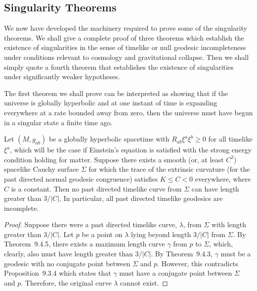 
\subsection{Singularity Theorems}\label{sec:9.5}

\setcounter{theorem}{0}

We now have developed the machinery required to prove some of the singularity
theorems. We shall give a complete proof of three theorems which establish the
existence of singularities in the sense of timelike or null geodesic incompleteness
under conditions relevant to cosmology and gravitational collapse. Then we shall
simply quote a fourth theorem that establishes the existence of singularities under
significantly weaker hypotheses.

The first theorem we shall prove can be interpreted as showing that if the universe is
globally hyperbolic and at one instant of time is expanding everywhere at a rate
bounded away from zero, then the universe must have begun in a singular state a
finite time ago.

\begin{theorem}\label{thm:9.5.1}
Let \((M,g_{ab})\) be a globally hyperbolic spacetime with
\(R_{ab}\xi^a\xi^b\geq0\) for all timelike \(\xi^a\), which will be the case if
Einstein's equation is satisfied with the strong energy condition holding for matter.
Suppose there exists a smooth (or, at least \(C^2\)) spacelike Cauchy surface
\(\Sigma\) for which the trace of the extrinsic curvature (for the past directed
normal geodesic congruence) satisfies \(K\leq C<0\) everywhere, where \(C\) is a
constant. Then no past directed timelike curve from \(\Sigma\) can have length
greater than \(3/\lvert C\rvert\). In particular, all past directed timelike geodesics
are incomplete.
\end{theorem}

\begin{proof}
Suppose there were a past directed timelike curve, \(\lambda\), from \(\Sigma\) with
length greater than \(3/\lvert C\rvert\). Let \(p\) be a point on \(\lambda\) lying
beyond length \(3/\lvert C\rvert\) from \(\Sigma\). By Theorem~9.4.5, there exists a
maximum length curve \(\gamma\) from \(p\) to \(\Sigma\), which, clearly, also must
have length greater than \(3/\lvert C\rvert\). By Theorem~9.4.3, \(\gamma\) must be a
geodesic with no conjugate point between \(\Sigma\) and \(p\). However, this
contradicts Proposition~9.3.4 which states that \(\gamma\) must have a conjugate
point between \(\Sigma\) and \(p\). Therefore, the original curve \(\lambda\) cannot
exist.
\end{proof}

